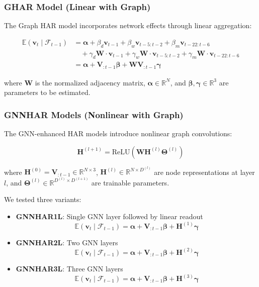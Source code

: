 \documentclass[10pt,a4paper]{article}
\newcommand{\E}{\mathbb{E}}
\newcommand{\bv}{\boldsymbol{v}}
\newcommand{\bV}{\boldsymbol{V}}
\newcommand{\bW}{\boldsymbol{W}}
\newcommand{\bH}{\boldsymbol{H}}
\newcommand{\bTheta}{\boldsymbol{\Theta}}
\newcommand{\balpha}{\boldsymbol{\alpha}}
\newcommand{\bbeta}{\boldsymbol{\beta}}
\newcommand{\bgamma}{\boldsymbol{\gamma}}
\begin{document}
\subsubsection{GHAR Model (Linear with Graph)}

The Graph HAR model incorporates network effects through linear aggregation:

\begin{align}
\E(\bv_t \mid \mathcal{F}_{t-1}) &= \balpha + \beta_d \bv_{t-1} + \beta_w \bv_{t-5:t-2} + \beta_m \bv_{t-22:t-6} \nonumber\\
&\quad + \gamma_d \bW \cdot \bv_{t-1} + \gamma_w \bW \cdot \bv_{t-5:t-2} + \gamma_m \bW \cdot \bv_{t-22:t-6} \nonumber\\
&= \balpha + \bV_{:t-1} \bbeta + \bW \bV_{:t-1} \bgamma
\end{align}

where $\bW$ is the normalized adjacency matrix, $\balpha \in \mathbb{R}^N$, and $\bbeta, \bgamma \in \mathbb{R}^3$ are parameters to be estimated.

\subsubsection{GNNHAR Models (Nonlinear with Graph)}

The GNN-enhanced HAR models introduce nonlinear graph convolutions:

\begin{equation}
\bH^{(l+1)} = \text{ReLU}(\bW \bH^{(l)} \bTheta^{(l)})
\end{equation}

where $\bH^{(0)} = \bV_{:t-1} \in \mathbb{R}^{N \times 3}$, $\bH^{(l)} \in \mathbb{R}^{N \times D^{(l)}}$ are node representations at layer $l$, and $\bTheta^{(l)} \in \mathbb{R}^{D^{(l)} \times D^{(l+1)}}$ are trainable parameters.

We tested three variants:

\begin{itemize}
\item \textbf{GNNHAR1L}: Single GNN layer followed by linear readout
\begin{equation}
\E(\bv_t \mid \mathcal{F}_{t-1}) = \balpha + \bV_{:t-1} \bbeta + \bH^{(1)} \bgamma
\end{equation}

\item \textbf{GNNHAR2L}: Two GNN layers
\begin{equation}
\E(\bv_t \mid \mathcal{F}_{t-1}) = \balpha + \bV_{:t-1} \bbeta + \bH^{(2)} \bgamma
\end{equation}

\item \textbf{GNNHAR3L}: Three GNN layers
\begin{equation}
\E(\bv_t \mid \mathcal{F}_{t-1}) = \balpha + \bV_{:t-1} \bbeta + \bH^{(3)} \bgamma
\end{equation}
\end{itemize}
\end{document}
